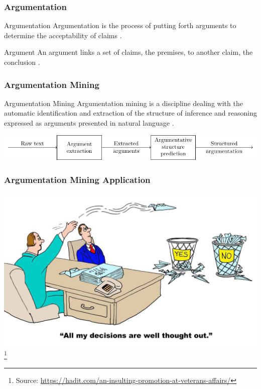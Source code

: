\documentclass{beamer}
\begin{document}
\begin{frame}
	\frametitle{Argumentation}

\begin{block}{Argumentation}
Argumentation is the process of putting forth arguments to determine  the
acceptability of claims \cite{walton1989informal}.
\end{block}

\begin{block}{Argument}
An argument links a set of claims, the premises, to another claim, the conclusion
\cite{walton1989informal}.
\end{block}
\end{frame}


\begin{frame}

\frametitle{Argumentation Mining}
\begin{block}{Argumentation Mining}
Argumentation mining is a discipline dealing with the automatic identification and extraction
of the structure of inference and reasoning expressed as arguments presented in natural language
\cite{lawrence2019argument}.
\end{block}

\vspace{1cm}
\includegraphics[scale=0.7]{../area_description_pipeline-figure0.pdf}
\end{frame}


\begin{frame}
\frametitle{Argumentation Mining Application}

\includegraphics[scale=0.2]{informed_decision.jpeg}
\footnote{
\tiny{Source: \url{https://hadit.com/an-insulting-promotion-at-veterans-affairs/}}}

\end{frame}
\end{document}
